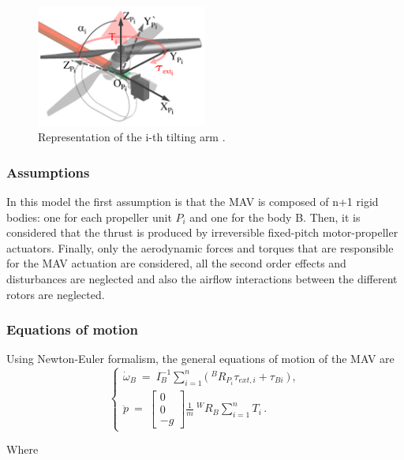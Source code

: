 \begin{figure}[h]
  \centering
  \includegraphics[width=0.5\textwidth]{images/tilt_model.png}
  \caption{Representation of the i-th tilting arm \citep{ryll_modeling_2012}.}
  \label{fig:tilt_model}
\end{figure}

\subsubsection{Assumptions}
\label{sec:assumptions}
In this model the first assumption is that the MAV is composed of n+1 rigid bodies:
one for each propeller unit $P_i$ and one for the body B. Then, it is considered that
the thrust is produced by irreversible fixed-pitch motor-propeller actuators. Finally,
only the aerodynamic forces and torques that are responsible for the MAV actuation
are considered, all the second order effects and disturbances are neglected and
also the airflow interactions between the different rotors are neglected.

\subsubsection{Equations of motion}
\label{sec:equations}
Using Newton-Euler formalism, the general equations of motion of the MAV are
\begin{equation}
  \label{acc_eq}
  \begin{cases}
    \dot{\omega}_B  \ = \ I_B^{-1} \sum_{i=1}^{n}  \big(\ ^{B}R_{P_{i}} \tau_{ext,i} + \tau_{Bi} \ \big) \, ,\\
    \ddot{p}  \ = \
    \begin{bmatrix}
      0 \\
      0 \\
      -g
    \end{bmatrix}
    \frac{1}{m} \ ^{W}R_B \sum_{i=1}^{n} T_i \, .
  \end{cases}
\end{equation}

Where

